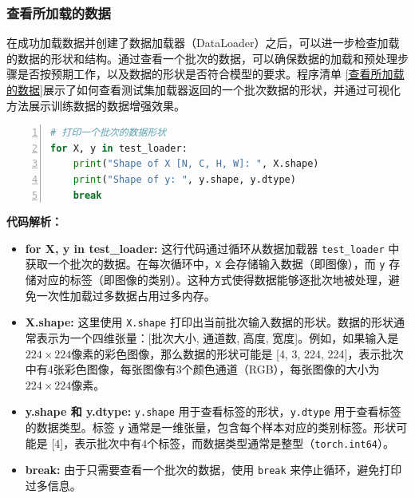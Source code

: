 \subsubsection{查看所加载的数据}
在成功加载数据并创建了数据加载器（DataLoader）之后，可以进一步检查加载的数据的形状和结构。通过查看一个批次的数据，可以确保数据的加载和预处理步骤是否按预期工作，以及数据的形状是否符合模型的要求。程序清单 \ref{查看所加载的数据}展示了如何查看测试集加载器返回的一个批次数据的形状，并通过可视化方法展示训练数据的数据增强效果。
\begin{lstlisting}[language={python},label={查看所加载的数据},caption={查看所加载的数据}, basicstyle=\footnotesize\ttfamily, breaklines=true, numbers=left, frame=single, showspaces=false,  showtabs=false，keepspaces=true,showstringspaces=false]
# 打印一个批次的数据形状
for X, y in test_loader:
    print("Shape of X [N, C, H, W]: ", X.shape)
    print("Shape of y: ", y.shape, y.dtype)
    break
\end{lstlisting}
\textbf{代码解析：}
\begin{itemize}
    \item \textbf{for X, y in test\_loader:} 这行代码通过循环从数据加载器 \texttt{test\_loader} 中获取一个批次的数据。在每次循环中，\texttt{X} 会存储输入数据（即图像），而 \texttt{y} 存储对应的标签（即图像的类别）。这种方式使得数据能够逐批次地被处理，避免一次性加载过多数据占用过多内存。
    \item \textbf{X.shape:} 这里使用 \texttt{X.shape} 打印出当前批次输入数据的形状。数据的形状通常表示为一个四维张量：[批次大小, 通道数, 高度, 宽度]。例如，如果输入是$224 \times 224$像素的彩色图像，那么数据的形状可能是 [4, 3, 224, 224]，表示批次中有4张彩色图像，每张图像有3个颜色通道（RGB），每张图像的大小为$224 \times 224$像素。
    \item \textbf{y.shape 和 y.dtype:} \texttt{y.shape} 用于查看标签的形状，\texttt{y.dtype} 用于查看标签的数据类型。标签 \texttt{y} 通常是一维张量，包含每个样本对应的类别标签。形状可能是 [4]，表示批次中有4个标签，而数据类型通常是整型（\texttt{torch.int64}）。
    \item \textbf{break:} 由于只需要查看一个批次的数据，使用 \texttt{break} 来停止循环，避免打印过多信息。
\end{itemize}

